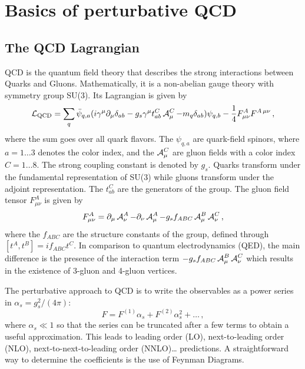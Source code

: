 
\chapter{Basics of perturbative QCD}
\label{ch:pqcd}
%
\section{The QCD Lagrangian}
QCD is the quantum field theory that describes the strong interactions between Quarks and Gluons.
Mathematically, it is a non-abelian gauge theory with symmetry group SU(3).
Its Lagrangian is given by
%
\begin{equation}
  \operatorname{\mathcal{L}}_\text{QCD} = \sum_q \bar\psi_{q,a} (i \gamma^\mu \partial_\mu \delta_{ab} - g_s \gamma^\mu t_{ab}^C \operatorname{\mathcal{A}}_\mu^C - m_q \delta_{ab}) \psi_{q,b} - \frac{1}{4} F_{\mu \nu}^A F^{A \, \mu \nu} \, ,
\end{equation}
%
where the sum goes over all quark flavors.
The $\psi_{q,a}$ are quark-field spinors, where $a=1 \dots 3$ denotes the color index, and the $\operatorname{\mathcal{A}}_\mu^C$ are gluon fields with a color index $C=1 \dots 8$.
The strong coupling constant is denoted by $g_s$.
Quarks transform under the fundamental representation of SU(3) while gluons transform under the adjoint representation.
The $t_{ab}^C$ are  the generators of the group.
The gluon field tensor $F_{\mu \nu}^A$ is given by
%
\begin{equation}
	F_{\mu \nu}^A = \partial_\mu \operatorname{\mathcal{A}}_\nu^A - \partial_\nu \operatorname{\mathcal{A}}_\mu^A - g_s f_{ABC} \operatorname{\mathcal{A}}_\mu^B \operatorname{\mathcal{A}}_\nu^C \, ,
\end{equation}
%
where the $f_{ABC}$ are the structure constants of the group, defined through $[ t^A,t^B ] = i f_{ABC} t^C$.
In comparison to quantum electrodynamics (QED), the main difference is the presence of the interaction term $- g_s f_{ABC} \operatorname{\mathcal{A}}_\mu^B \operatorname{\mathcal{A}}_\nu^C$ which results in the existence of 3-gluon and 4-gluon vertices.

The perturbative approach to QCD is to write the observables as a power series in $\alpha_s = g_s^2/(4 \pi)$:
%
\begin{equation}
  F = F^{(1)} \alpha_s + F^{(2)} \alpha_s^2 + \dots \, ,
\end{equation}
%
where $\alpha_s \ll 1$ so that the series can be truncated after a few terms to obtain a useful approximation.
This leads to leading order (LO), next-to-leading order (NLO), next-to-next-to-leading order (NNLO)\ldots{} predictions.
A straightforward way to determine the coefficients is the use of Feynman Diagrams.
%
